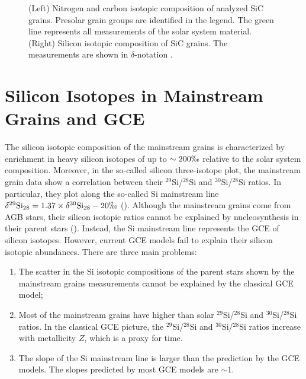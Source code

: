 \documentclass{brandeis-thesis3.2}
\newcommand{\iso}[2]{$^{#1}${#2}}
\newcommand{\del}[3]{\delta^{#1}\text{#3}_{#2}}
\begin{document}
\begin{figure}[H]
\begin{subfigure}[b]{0.48\textwidth}
     \end{subfigure}
     \caption{(Left) Nitrogen and carbon isotopic composition of analyzed SiC grains. Presolar grain groups are identified in the legend. The green line represents all measurements of the solar system material. (Right) Silicon isotopic composition of SiC grains. The measurements are shown in $\delta$-notation \citep[data from][]{stephan_20}.}
     \label{fig:sic}
\end{figure}

\section{Silicon Isotopes in Mainstream Grains and GCE} \label{m gce intro}
The silicon isotopic composition of the mainstream grains is characterized by enrichment in heavy silicon isotopes of up to $\sim200\permil$ relative to the solar system composition. Moreover, in the so-called silicon three-isotope plot, the mainstream grain data show a correlation between their \iso{29}{Si}/\iso{28}{Si} and \iso{30}{Si}/\iso{28}{Si} ratios. In particular, they plot along the so-called Si mainstream line $\del{29}{28}{Si} = 1.37 \times \del{30}{28}{Si} -20\permil$ (\citealt{Zinner2007}). Although the mainstream grains come from AGB stars, their silicon isotopic ratios cannot be explained by nucleosynthesis in their parent stars (\citealt{Lugaro1999}). Instead, the Si mainstream line represents the GCE of silicon isotopes. However, current GCE models fail to explain their silicon isotopic abundances. There are three main problems:
\begin{enumerate}
    \item The scatter in the Si isotopic compositions of the parent stars shown by the mainstream grains measurements cannot be explained by the classical GCE model;
    \item Most of the mainstream grains have higher than solar \iso{29}{Si}/\iso{28}{Si} and \iso{30}{Si}/\iso{28}{Si} ratios. In the classical GCE picture, the \iso{29}{Si}/\iso{28}{Si} and \iso{30}{Si}/\iso{28}{Si} ratios increase with metallicity $Z$, which is a proxy for time.
    \item The slope of the Si mainstream line is larger than the prediction by the GCE models. The slopes predicted by most GCE models are $\sim$1.
\end{enumerate}

\end{document}
